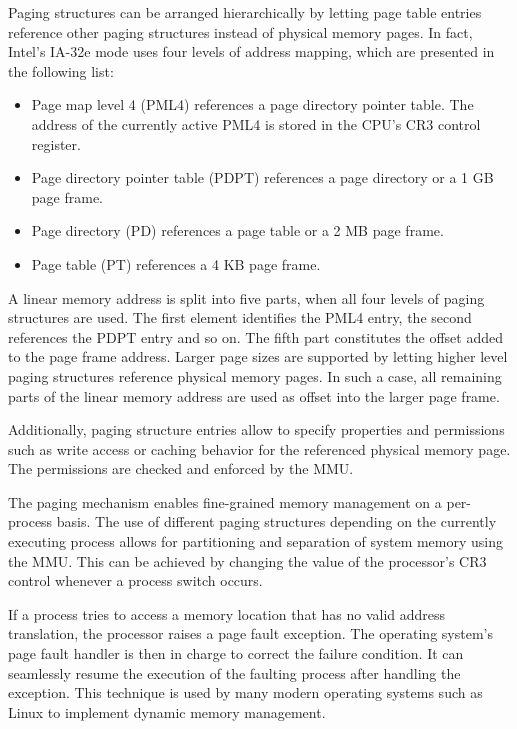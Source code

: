 Paging structures can be arranged hierarchically by letting page table entries
reference other paging structures instead of physical memory pages. In fact,
Intel's IA-32e mode uses four levels of address mapping, which are presented in
the following list:

\begin{itemize}
	\item Page map level 4 (PML4) references a page directory pointer table. The
		address of the currently active PML4 is stored in the CPU's CR3 control
		register.
	\item Page directory pointer table (PDPT) references a page directory or a 1
		GB page frame.
	\item Page directory (PD) references a page table or a 2 MB page frame.
	\item Page table (PT) references a 4 KB page frame.
\end{itemize}

A linear memory address is split into five parts, when all four levels of paging
structures are used. The first element identifies the PML4 entry, the second
references the PDPT entry and so on. The fifth part constitutes the offset added
to the page frame address. Larger page sizes are supported by letting higher
level paging structures reference physical memory pages. In such a case, all
remaining parts of the linear memory address are used as offset into the larger
page frame.

Additionally, paging structure entries allow to specify properties and
permissions such as write access or caching behavior for the referenced
physical memory page. The permissions are checked and enforced by the MMU.

The paging mechanism enables fine-grained memory management on a per-process
basis. The use of different paging structures depending on the currently
executing process allows for partitioning and separation of system memory using
the MMU. This can be achieved by changing the value of the processor's CR3
control whenever a process switch occurs.

If a process tries to access a memory location that has no valid address
translation, the processor raises a page fault exception. The operating system's
page fault handler is then in charge to correct the failure condition. It can
seamlessly resume the execution of the faulting process after handling the
exception. This technique is used by many modern operating systems such as Linux
to implement dynamic memory management.

